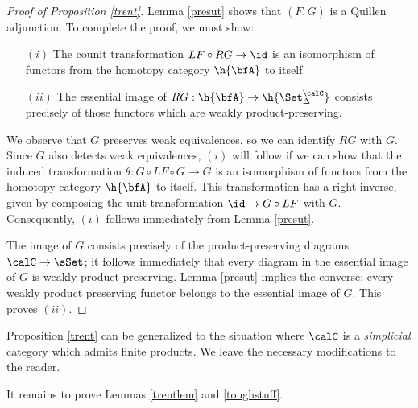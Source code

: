 \begin{proof}[Proof of Proposition \ref{trent}]
Lemma \ref{presut} shows that $(F,G)$ is a Quillen adjunction. To complete the proof, we must show:

\begin{itemize}
\item[$(i)$] The counit transformation $LF \circ RG \rightarrow \id$ is an isomorphism of functors
from the homotopy category $\h{\bfA}$ to itself.
\item[$(ii)$] The essential image of $RG: \h{\bfA} \rightarrow \h{ \Set_{\Delta}^{\calC} }$ consists
precisely of those functors which are weakly product-preserving.
\end{itemize}

We observe that $G$ preserves weak equivalences, so we can identify $RG$ with $G$. Since $G$ also detects weak equivalences, $(i)$ will follow if we can show that the induced transformation
$\theta: G \circ LF \circ G \rightarrow G$ is an isomorphism of functors from the homotopy
category $\h{\bfA}$ to itself. This transformation has a right inverse, given by composing the unit transformation $\id \rightarrow G \circ LF$ with $G$. Consequently, $(i)$ follows immediately from Lemma \ref{presut}. 

The image of $G$ consists precisely of the product-preserving diagrams $\calC \rightarrow \sSet$; it follows immediately that every diagram in the essential image of $G$ is weakly product preserving. Lemma \ref{presut} implies the converse: every weakly product preserving functor belongs to the essential image of $G$. This proves $(ii)$.
\end{proof}

\begin{remark}
Proposition \ref{trent} can be generalized to the situation where $\calC$ is a {\em simplicial} category which admits finite products. We leave the necessary modifications to the reader.
\end{remark}

It remains to prove Lemmas \ref{trentlem} and \ref{toughstuff}.

